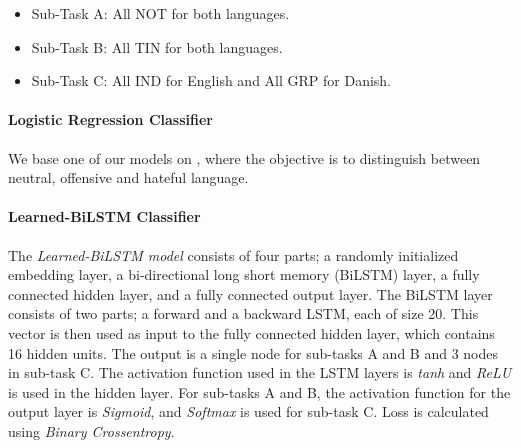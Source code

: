 \documentclass{article}
\begin{document}
\iffalse






\fi

\iffalse
\paragraph{RNNs}
Our neural network models use \textit{Recurrent Neural Networks (RNNs)} \cite{elman1990finding} as a key element in their architecture. RNNs compute a fixed size vector representation of a sequence, by reading in  vectors , and producing an output vector  that depends on the entire sequence \cite{plank2016multilingual}. 

\paragraph{Bi-directional RNNs} (BiRNNs) are another extension of RNNs, where each input sequence is read twice, from left to right and right to left \cite{plank2016multilingual}. This bi-directional approach is based on the idea that the elements in a sequence are based on both the previous and future elements. Our models use \textit{Bi-directional LSTMs (BiLSTMs}), where the output vectors from the forward and backward pass are concatenated. 
\fi

\begin{itemize}
 \setlength\itemsep{-1mm}
 \item Sub-Task A: All NOT for both languages.
    \item Sub-Task B: All TIN for both languages.
    \item Sub-Task C: All IND for English and All GRP for Danish. 
\end{itemize}

\paragraph{Logistic Regression Classifier}\label{lrClassifier}
We base one of our models on \cite{davidson2017automated}, where the objective is to distinguish between neutral, offensive and hateful language. 

\paragraph{Learned-BiLSTM Classifier}\label{learnedBiLSTMClassifier}
The \textit{Learned-BiLSTM model} consists of four parts; a randomly initialized embedding layer, a bi-directional long short memory (BiLSTM) layer, a fully connected hidden layer, and a fully connected output layer.  The BiLSTM layer consists of two parts; a forward and a backward LSTM, each of size 20. This vector is then used as input to the fully connected hidden layer, which contains 16 hidden units. The output is a single node for sub-tasks A and B and 3 nodes in sub-task C. The activation function used in the LSTM layers is \textit{tanh} and \textit{ReLU} is used in the hidden layer. For sub-tasks A and B, the activation function for the output layer is \textit{Sigmoid}, and \textit{Softmax} is used for sub-task C. Loss is calculated using \textit{Binary Crossentropy}.
\end{document}
